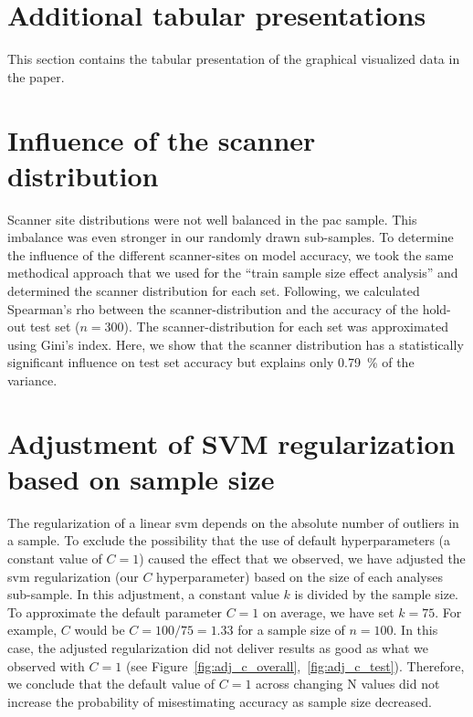 \FloatBarrier


\section{Additional tabular presentations}
This section contains the tabular presentation of the graphical visualized data in the paper.


\FloatBarrier


\section{Influence of the scanner distribution}
\label{cha:influence-of-scanner-distribution}
Scanner site distributions were not well balanced in the \ac{pac} sample.
This imbalance was even stronger in our randomly drawn sub-samples. To determine the influence of the different scanner-sites on model accuracy, we took the same methodical approach that we used for the “train sample size effect analysis” and determined the scanner distribution for each set. Following, we calculated Spearman’s rho between the scanner-distribution and the accuracy of the hold-out test set ($n=300$). The scanner-distribution for each set was approximated using Gini’s index. Here, we show that the scanner distribution has a statistically significant influence on test set accuracy but explains only \SI{0.79}{\percent} of the variance.


\FloatBarrier


\section{Adjustment of SVM regularization based on sample size}
\label{cha:adjustment-svm-regularization}
The regularization of a linear \ac{svm} depends on the absolute number of outliers in a sample. To exclude the possibility that the use of default hyperparameters (a constant value of $C = 1$) caused the effect that we observed, we have adjusted the \ac{svm} regularization (our $C$ hyperparameter) based on the size of each analyses sub-sample. In this adjustment, a constant value $k$ is divided by the sample size. To approximate the default parameter $C=1$ on average, we have set $k=75$. For example, $C$ would be $C = 100/75 = \num{1.33}$ for a sample size of $n=100$. In this case, the adjusted regularization did not deliver results as good as what we observed with $C=1$ (see Figure~\ref{fig:adj_c_overall},~\ref{fig:adj_c_test}). Therefore, we conclude that the default value of $C=1$ across changing N values did not increase the probability of misestimating accuracy as sample size decreased.

